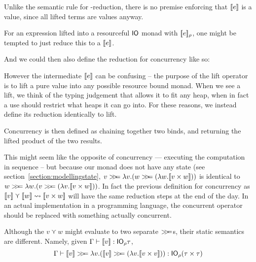 Unlike the semantic rule for \beta-reduction, there is no premise
enforcing that $\lift{e}$ is a value, since all lifted terms are
values anyway.

For an expression lifted into a resourceful $\IO$ monad with
$\use{\rho}{e}$, one might be tempted to just reduce this to a $\lift{e}$.
\begin{mathpar}
\end{mathpar}

And we could then also define the reduction for concurrency like so:
\begin{mathpar}
\end{mathpar}

However the intermediate $\lift{e}$ can be confusing -- the purpose of
the lift operator is to lift a pure value into any possible resource
bound monad. When we see a lift, we think of the typing judgement that
allows it to fit any heap, when in fact a use should restrict what
heaps it can go into. For these reasons, we instead define its
reduction identically to lift.
\begin{mathpar}
\end{mathpar}

Concurrency is then defined as chaining together two binds, and
returning the lifted product of the two results.
\begin{mathpar}
\end{mathpar}

This might seem like the opposite of concurrency --- executing the
computation in sequence -- but because our monad does not have any
state (see section~\ref{section:modellingstate},
${v \bind \lambda v . (w \bind (\lambda w . \lift{v \times w}))}$ is identical to
$w \bind \lambda w . (v \bind (\lambda v . \lift{v \times w}))$. In fact the previous
definition for concurrency as
$\lift{v} \curlyvee \lift{w} \leadsto \llbracket v \times w\rrbracket$ will have the same reduction steps at
the end of the day. In an actual implementation in a programming
language, the concurrent operator should be replaced with something
actually concurrent.

Although the $v \curlyvee w$ might evaluate to two separate $\bind$s, their
static semantics are different. Namely, given
$\Gamma \vdash \lift{v} : \IO_\rho \tau$,
\[
\Gamma \vdash \lift{v} \bind \lambda v . (\lift{v} \bind (\lambda v . \lift{v \times v})) : \IO_\rho (\tau \times \tau)
\]

